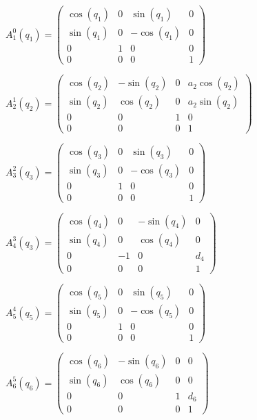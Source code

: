 \begin{center}
$A^0_1(q_1) = \left(
\begin{matrix}
\cos{(q_1)} & 0 & \sin{(q_1)} & 0 \\ 
\sin{(q_1)} & 0 & -\cos{(q_1)} & 0 \\ 
0 & 1 & 0 & 0 \\ 
0 & 0 & 0 & 1 
\end{matrix}
\right)$
\vspace{0.5cm}

$A^1_2(q_2) = \left(
\begin{matrix}
\cos{(q_2)} & -\sin{(q_2)} & 0 & a_2\cos{(q_2)} \\ 
\sin{(q_2)} & \cos{(q_2)} & 0  & a_2\sin{(q_2)} \\ 
0 & 0 & 1 & 0 \\ 
0 & 0 & 0 & 1 
\end{matrix}
\right)$
\vspace{0.5cm}

$A^2_3(q_3) = \left(
\begin{matrix}
\cos{(q_3)} & 0 & \sin{(q_3)} & 0 \\ 
\sin{(q_3)} & 0 & -\cos{(q_3)} & 0 \\ 
0 & 1 & 0 & 0 \\ 
0 & 0 & 0 & 1 
\end{matrix}
\right)$
\vspace{0.5cm}

$A^3_4(q_3) = \left(
\begin{matrix}
\cos{(q_4)} & 0 & -\sin{(q_4)} & 0 \\ 
\sin{(q_4)} & 0 & \cos{(q_4)} & 0 \\ 
0 & -1 & 0 & d_4 \\ 
0 & 0 & 0 & 1 
\end{matrix}
\right)$
\vspace{0.5cm}

$A^4_5(q_5) = \left(
\begin{matrix}
\cos{(q_5)} & 0 & \sin{(q_5)} & 0 \\ 
\sin{(q_5)} & 0 & -\cos{(q_5)} & 0 \\ 
0 & 1 & 0 & 0 \\ 
0 & 0 & 0 & 1 
\end{matrix}
\right)$
\vspace{0.5cm}

$A^5_6(q_6) = \left(
\begin{matrix}
\cos{(q_6)} & -\sin{(q_6)} & 0 & 0 \\ 
\sin{(q_6)} & \cos{(q_6)} & 0 & 0 \\ 
0 & 0 & 1 & d_6 \\ 
0 & 0 & 0 & 1 
\end{matrix}
\right)$
\end{center}
